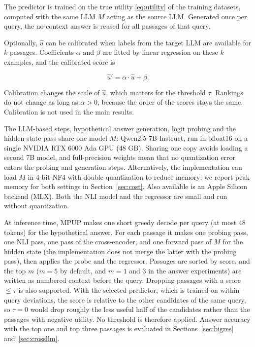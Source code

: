 \documentclass[preprint,12pt,authoryear]{elsarticle}
\begin{document}
The predictor is trained on the true utility \eqref{eq:utility} of the training datasets, computed with the same LLM $M$ acting
as the source LLM. Generated once per query, the no-context answer is reused for all passages of that query.

Optionally, $\hat{u}$ can be calibrated when labels from the target
LLM are available for $k$ passages. Coefficients $\alpha$ and $\beta$ are fitted by linear regression on these $k$ examples, and the calibrated score is

\begin{equation}
    \hat{u}' = \alpha \cdot \hat{u} + \beta.
    \label{eq:calib}
\end{equation}

Calibration changes the scale of $\hat{u}$, which matters for the threshold
$\tau$. Rankings do not change as long as $\alpha > 0$,
because the order of the scores stays the same. Calibration is not
used in the main results.

The LLM-based steps, hypothetical answer generation, logit probing and the hidden-state pass share one model $M$: Qwen2.5-7B-Instruct, run in bfloat16 on
a single NVIDIA RTX 6000 Ada GPU (48 GB). Sharing one copy avoids
loading a second 7B model, and full-precision weights mean that no
quantization error enters the probing and generation steps. Alternatively, the implementation can load $M$ in 4-bit NF4 with double
quantization to reduce memory; we report peak memory for both settings
in Section~\ref{sec:cost}. Also available is an Apple Silicon backend (MLX). Both the NLI model and the regressor are small and run without
quantization.

At inference time, MPUP makes one short greedy decode per query (at
most 48 tokens) for the hypothetical answer. For each passage it makes
one probing pass, one NLI pass, one pass of the cross-encoder, and one forward pass of $M$ for the hidden state (the implementation does not merge the latter with the probing pass), then applies the probe and the regressor. Passages are sorted by score, and the top $m$ ($m = 5$ by default, and $m = 1$ and $3$ in the answer experiments)
are written as numbered context before the query. Dropping passages with a score $\leq \tau$ is also supported. With the selected
predictor, which is trained on within-query deviations, the score is
relative to the other candidates of the same query, so $\tau = 0$
would drop roughly the less useful half of the candidates rather than
the passages with negative utility. No threshold is therefore applied.
Answer accuracy with the top one and top three passages is evaluated in Sections~\ref{sec:bigres} and~\ref{sec:crossllm}.
\end{document}
